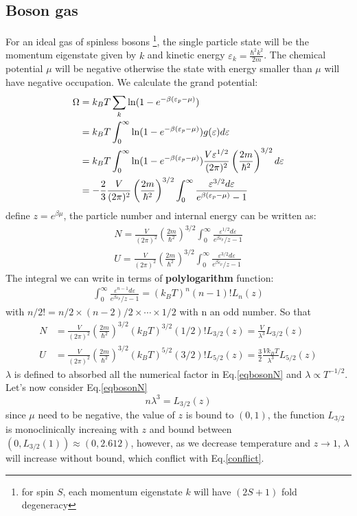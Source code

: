 \documentclass{article}
\begin{document}
\subsection{Boson gas}
For an ideal gas of spinless bosons \footnote{for spin $S$, each momentum eigenstate $k$ will have $(2S+1)$ fold degeneracy}, 
the single particle state will be the momentum eigenstate given by 
$k$ and kinetic energy $\varepsilon_k = \frac{\hbar^2k^2}{2m}$. The chemical potential $\mu$ will be negative otherwise 
the state with energy smaller than $\mu$ will have negative occupation.
We calculate the grand potential:
\begin{align}
    \Omega &= k_BT \sum_k \ln(1-e^{-\beta(\varepsilon_p - \mu)}) \notag \\
            &= k_BT \int_0^{\infty} \ln(1-e^{-\beta(\varepsilon_p - \mu)}) g(\varepsilon) d\varepsilon \notag \\
            &= k_BT \int_0^{\infty} \ln(1-e^{-\beta(\varepsilon_p - \mu)}) \frac{V\varepsilon^{1/2}}{(2\pi)^2}\left(\frac{2m}{\hbar^2}\right)^{3/2} d\varepsilon \notag \\
            &= -\frac{2}{3} \frac{V}{(2\pi)^2}\left(\frac{2m}{\hbar^2}\right)^{3/2} \int_0^{\infty} \frac{\varepsilon^{3/2}d\varepsilon}{e^{\beta(\varepsilon_p - \mu)}-1} \label{todos}
\end{align}
define $z = e^{\beta\mu}$, the particle number and internal energy can be written as:
\begin{align}
    N = \frac{V}{(2\pi)^2}\left(\frac{2m}{\hbar^2}\right)^{3/2} \int_0^{\infty} \frac{\varepsilon^{1/2}d\varepsilon}{e^{\beta\varepsilon_p}/z-1} \\
    U = \frac{V}{(2\pi)^2}\left(\frac{2m}{\hbar^2}\right)^{3/2} \int_0^{\infty} \frac{\varepsilon^{3/2}d\varepsilon}{e^{\beta\varepsilon_p}/z-1}
\end{align}
The integral we can write in terms of \textbf{polylogarithm} function:
\begin{align}
    \int_0^{\infty} \frac{\varepsilon^{n-1}d\varepsilon}{e^{\beta\varepsilon_p}/z-1} = (k_BT)^n (n-1)! L_n(z)
\end{align}
with $n/2! = n/2 \times (n-2)/2 \times \cdots \times 1/2$ with n an odd number.
So that 
\begin{align}
    N &= \frac{V}{(2\pi)^2}\left(\frac{2m}{\hbar^2}\right)^{3/2} (k_BT)^{3/2} (1/2)! L_{3/2}(z) = \frac{V}{\lambda^3} L_{3/2}(z) \label{eqbosonN} \\
    U &= \frac{V}{(2\pi)^2}\left(\frac{2m}{\hbar^2}\right)^{3/2} (k_BT)^{5/2} (3/2)! L_{5/2}(z) = \frac{3}{2}\frac{Vk_BT}{\lambda^3} L_{5/2}(z)
\end{align}
$\lambda$ is defined to absorbed all the numerical factor in Eq.\ref{eqbosonN} and $\lambda \propto T^{-1/2}$. 
Let's now consider Eq.\ref{eqbosonN}
\begin{equation}
    n \lambda^3 = L_{3/2}(z) \label{conflict}
\end{equation}
since $\mu$ need to be negative, the value of $z$ is bound to $(0,1)$, the function $L_{3/2}$ is monoclinically increaing with $z$ and bound
between $(0,L_{3/2}(1)) \approx (0,2.612)$, however, as we decrease temperature and $z \to 1$, 
$\lambda$ will increase without bound, which conflict with Eq.\ref{conflict}. 
\end{document}
